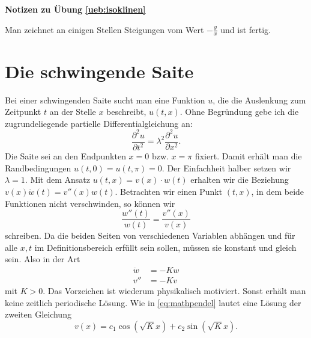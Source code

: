 \documentclass[%
11pt,%
twoside,%
titlepage,%
swissgerman,%
headsepline%
]{scrartcl}
\newcommand{\faReturnGray}{\textcolor{gray}{\faMailReply}} %
\theoremstyle{definition}
\theoremstyle{plain}
\newcommand{\concatueb}[1]{ueb:#1}%
\newcommand{\concatlsg}[1]{lsg:#1}%
\newenvironment{lsg}[1]{%
    \par\noindent\textbf{Notizen zu Übung \ref{\concatueb{#1}}}\label{\concatlsg{#1}}
    \hfill\hyperref[\concatueb{#1}]{\faReturnGray}\par %
}{%
    \par%
}
\begin{document}
\begin{lsg}{isoklinen}
    Man zeichnet an einigen Stellen Steigungen vom Wert $-\frac{y}{x}$ und ist fertig.

\begin{center}
\end{center}
\end{lsg}

\clearpage

\section{Die schwingende Saite}

Bei einer schwingenden Saite sucht man eine Funktion $u$, die die Auslenkung zum Zeitpunkt $t$ an der Stelle $x$ beschreibt, $u(t,x)$.
Ohne Begründung gebe ich die zugrundeliegende partielle Differentialgleichung an:
\begin{equation}\label{eq:saite}
\frac{\partial^2u}{\partial t^2}=\lambda^2\frac{\partial^2u}{\partial x^2}.
\end{equation}
Die Saite sei an den Endpunkten $x=0$ bzw. $x=\pi$ fixiert. Damit erhält man die Randbedingungen $u(t,0)=u(t,\pi)=0$. Der Einfachheit halber setzen wir $\lambda=1$.
Mit dem Ansatz $u(t,x)=v(x)\cdot w(t)$
erhalten wir die Beziehung $v(x)\ddot{w}(t)=v''(x)w(t)$.
Betrachten wir einen Punkt $(t,x)$, in dem beide Funktionen nicht verschwinden, so können wir
$$\frac{w''(t)}{w(t)}=\frac{v''(x)}{v(x)}$$
schreiben. Da die beiden Seiten von verschiedenen Variablen abhängen und für alle $x,t$ im Definitionsbereich erfüllt sein sollen, müssen sie konstant und gleich sein. Also in der Art
\begin{align*}
\ddot{w}&=-Kw\\
v''&=-Kv
\end{align*}
mit $K>0$. Das Vorzeichen ist wiederum physikalisch motiviert. Sonst erhält man keine zeitlich periodische Lösung. Wie in \eqref{eq:mathpendel} lautet eine Lösung der zweiten Gleichung
$$v(x)=c_1\cos(\sqrt{K}x)+c_2\sin(\sqrt{K}x).$$
\end{document}
